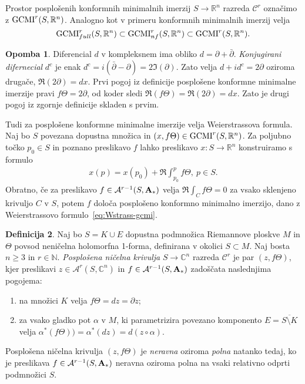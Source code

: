 \documentclass[12pt,a4paper,twoside]{article}
\theoremstyle{definition} %
\newtheorem{definicija}{Definicija}[section]
\newtheorem{opomba}[definicija]{Opomba}
\theoremstyle{plain} %
\numberwithin{equation}{section}  %
\newcommand{\R}{\mathbb R}
\newcommand{\N}{\mathbb N}
\newcommand{\C}{\mathbb C}
\begin{document}
Prostor posplošenih konformnih minimalnih imerzij $S \to \R^{n}$ razreda $\mathcal{C}^{r}$ označimo z $\textup{GCMI}^{r}(S, \R^{n})$. Analogno kot v primeru konformnih minimalnih imerzij velja 
\[ \textup{GCMI}_{full}^{r}(S, \R^{n}) \subset \textup{GCMI}_{nf}^{r}(S, \R^{n}) \subset \textup{GCMI}^{r}(S, \R^{n}). \]

\begin{opomba}
Diferencial $d$ v kompleksnem ima obliko $d = \partial + \bar{\partial}$. \emph{Konjugirani difernecial} $d^{c}$ je enak $d^{c} = i(\bar{\partial} - \partial) = 2 \Im(\partial)$. Zato velja $d + i d^{c} = 2 \partial$ oziroma drugače, $\Re(2 \partial) = dx$.
Prvi pogoj iz definicije posplošene konformne minimalne imerzije pravi $f \Theta = 2 \partial$, od koder sledi $\Re(f \Theta) = \Re(2 \partial) = dx$. Zato je drugi pogoj iz zgornje definicije skladen s prvim.
\end{opomba}

Tudi za posplošene konformne minimalne imerzije velja Weierstrassova formula.
Naj bo $S$ povezana dopustna množica in $(x, f \Theta) \in \textup{GCMI}^{r}(S, \R^{n})$. Za poljubno točko $p_{0} \in S$ in poznano preslikavo $f$ lahko preslikavo $x \colon S \to \R^{n}$ konstruiramo s formulo
\begin{align} \label{eq:Wstrass-gcmi}
x(p) = x(p_{0}) + \Re \int_{p_0}^{p} f \Theta, \ p \in S.
\end{align} 
Obratno, če za preslikavo $f \in \mathcal{A}^{r-1}(S, \textbf{\textup{A}}_{*})$ velja $ \Re \int_{C} f \Theta = 0$ za vsako sklenjeno krivuljo $C$ v $S$, potem $f$ določa posplošeno konformno minimalno imerzijo, dano z Weierstrassovo formulo~\ref{eq:Wstrass-gcmi}.

\begin{definicija}
Naj bo $S = K \cup E$ dopustna podmnožica Riemannove ploskve $M$ in $\Theta$ povsod neničelna holomorfna 1-forma, definirana v okolici $S \subset M$.
Naj bosta $n \geq 3$ in $r \in \N$. \emph{Posplošena ničelna krivulja} $S \to \C^{n}$ razreda $\mathcal{C}^{r}$ je par $(z, f \Theta)$, kjer preslikavi $z \in \mathcal{A}^{r}(S, \C^{n})$ in $f \in \mathcal{A}^{r-1}(S, \textbf{\textup{A}}_{*})$ zadoščata naslednjima pogojema:
\begin{enumerate}
\item na množici $K$ velja $f \Theta = dz = \partial z$;
\item za vsako gladko pot $\alpha$ v $M$, ki parametrizira povezano komponento $E = \overline{S \setminus K}$ velja $ \alpha^{*}(f \Theta)) = \alpha^{*}(dz) = d(z \circ \alpha)$.
\end{enumerate}
%
Posplošena ničelna krivulja $(z, f \Theta)$ je \emph{neravna} oziroma \emph{polna} natanko tedaj, ko je preslikava $f \in \mathcal{A}^{r-1}(S, \textbf{\textup{A}}_{*})$ neravna oziroma polna na vsaki relativno odprti podmnožici $S$.
\end{definicija}
\end{document}
